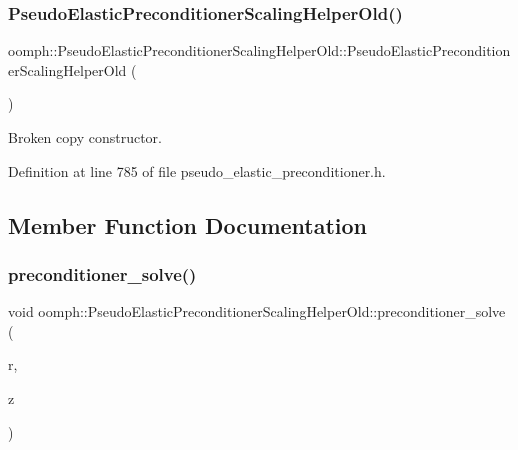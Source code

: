 \subsubsection{\texorpdfstring{Pseudo\+Elastic\+Preconditioner\+Scaling\+Helper\+Old()}{PseudoElasticPreconditionerScalingHelperOld()}\hspace{0.1cm}{\footnotesize\ttfamily [2/2]}}
{\footnotesize\ttfamily oomph\+::\+Pseudo\+Elastic\+Preconditioner\+Scaling\+Helper\+Old\+::\+Pseudo\+Elastic\+Preconditioner\+Scaling\+Helper\+Old (\begin{DoxyParamCaption}\item[{const \hyperlink{classoomph_1_1PseudoElasticPreconditionerScalingHelperOld}{Pseudo\+Elastic\+Preconditioner\+Scaling\+Helper\+Old} \&}]{ }\end{DoxyParamCaption})\hspace{0.3cm}{\ttfamily [inline]}}



Broken copy constructor. 



Definition at line 785 of file pseudo\+\_\+elastic\+\_\+preconditioner.\+h.



\subsection{Member Function Documentation}
\mbox{\label{classoomph_1_1PseudoElasticPreconditionerScalingHelperOld_a185bc08ce33f220d9ef61745b46e0633}} 
\subsubsection{\texorpdfstring{preconditioner\+\_\+solve()}{preconditioner\_solve()}}
{\footnotesize\ttfamily void oomph\+::\+Pseudo\+Elastic\+Preconditioner\+Scaling\+Helper\+Old\+::preconditioner\+\_\+solve (\begin{DoxyParamCaption}\item[{const Double\+Vector \&}]{r,  }\item[{Double\+Vector \&}]{z }\end{DoxyParamCaption})\hspace{0.3cm}{\ttfamily [inline]}}



